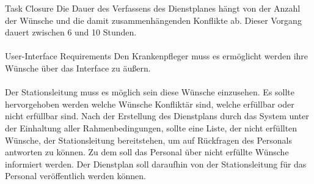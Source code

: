 \documentclass[11pt,
paper=a4,
bibtotocnumbered,	  %
liststotocnumbered,  %
DIV=calc,		  %
tablecaptionabove,	  %
headinclude,
]{article}
\begin{document}
Task Closure
Die Dauer des Verfassens des Dienstplanes hängt von der Anzahl der Wünsche und die damit zusammenhängenden Konflikte ab. Dieser Vorgang dauert zwischen 6 und 10 Stunden.\\\\
User-Interface Requirements
Den Krankenpfleger muss es ermöglicht werden ihre Wünsche über das Interface zu äußern.\\\\
Der Stationsleitung muss es möglich sein diese Wünsche einzusehen. Es sollte hervorgehoben werden welche Wünsche Konfliktär sind, welche erfüllbar oder nicht erfüllbar sind. Nach der Erstellung des Dienstplans durch das System unter der Einhaltung aller Rahmenbedingungen, sollte eine Liste, der nicht erfüllten Wünsche, der Stationsleitung bereitstehen, um auf Rückfragen des Personals antworten zu können. Zu dem soll das Personal über nicht erfüllte Wünsche informiert werden.
Der Dienstplan soll daraufhin von der Stationsleitung für das Personal veröffentlich werden können.\\\\
\end{document}
